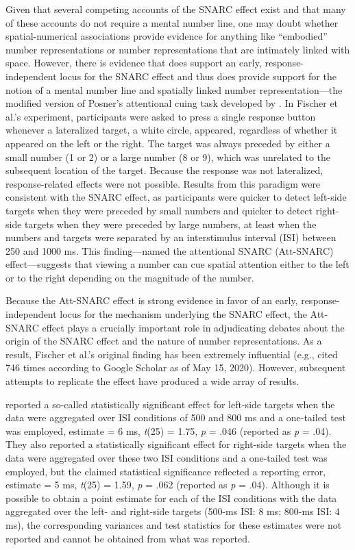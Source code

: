\documentclass[man,floatsintext]{apa6}
\theoremstyle{definition}
\theoremstyle{definition}
\theoremstyle{definition}
\theoremstyle{remark}
\begin{document}
Given that several competing accounts of the SNARC effect exist and that
many of these accounts do not require a mental number line, one may
doubt whether spatial-numerical associations provide evidence for
anything like \enquote{embodied} number representations or number
representations that are intimately linked with space. However, there is
evidence that does support an early, response-independent locus for the
SNARC effect and thus does provide support for the notion of a mental
number line and spatially linked number representation---the modified
version of Posner's \autocite*{Posner} attentional cuing task developed
by \textcite{Fischer:2003ju}. In Fischer et al.'s experiment,
participants were asked to press a single response button whenever a
lateralized target, a white circle, appeared, regardless of whether it
appeared on the left or the right. The target was always preceded by
either a small number (1 or 2) or a large number (8 or 9), which was
unrelated to the subsequent location of the target. Because the response
was not lateralized, response-related effects were not possible. Results
from this paradigm were consistent with the SNARC effect, as
participants were quicker to detect left-side targets when they were
preceded by small numbers and quicker to detect right-side targets when
they were preceded by large numbers, at least when the numbers and
targets were separated by an interstimulus interval (ISI) between 250
and 1000 ms. This finding---named the attentional SNARC (Att-SNARC)
effect---suggests that viewing a number can cue spatial attention either
to the left or to the right depending on the magnitude of the number.

Because the Att-SNARC effect is strong evidence in favor of an early,
response-independent locus for the mechanism underlying the SNARC
effect, the Att-SNARC effect plays a crucially important role in
adjudicating debates about the origin of the SNARC effect and the nature
of number representations. As a result, Fischer et al.'s original
finding has been extremely influential (e.g., cited 746 times according
to Google Scholar as of May 15, 2020). However, subsequent attempts to
replicate the effect have produced a wide array of results.

\textcite{Galfano:2006cu} reported a so-called statistically significant
effect for left-side targets when the data were aggregated over ISI
conditions of 500 and 800 ms and a one-tailed test was employed,
estimate = 6 ms, \emph{t}(25) = 1.75, \emph{p} = .046 (reported as
\emph{p} = .04). They also reported a statistically significant effect
for right-side targets when the data were aggregated over these two ISI
conditions and a one-tailed test was employed, but the claimed
statistical significance reflected a reporting error, estimate = 5 ms,
\emph{t}(25) = 1.59, \emph{p} = .062 (reported as \emph{p} = .04).
Although it is possible to obtain a point estimate for each of the ISI
conditions with the data aggregated over the left- and right-side
targets (500-ms ISI: 8 ms; 800-ms ISI: 4 ms), the corresponding
variances and test statistics for these estimates were not reported and
cannot be obtained from what was reported.
\end{document}
